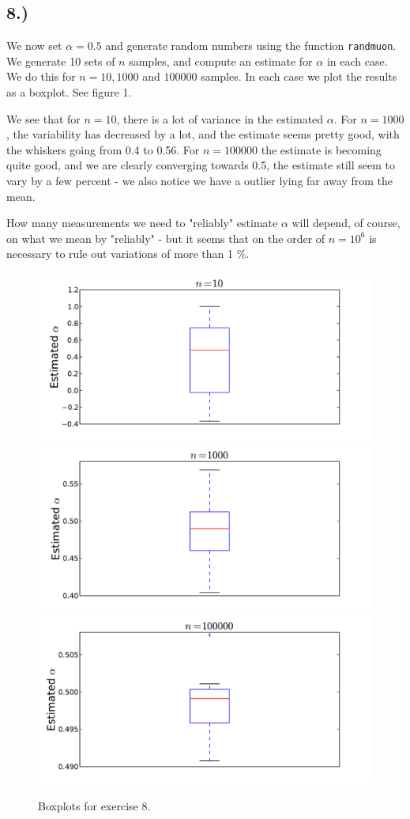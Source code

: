 \documentclass[a4paper, 11pt, notitlepage, english]{article}
\begin{document}
\subsection*{8.)}

We now set $\alpha = 0.5$ and generate random numbers using the function \verb+randmuon+. We generate 10 sets of $n$ samples, and compute an estimate for $\alpha$ in each case. We do this for $n=10, 1000$ and $100000$ samples. In each case we plot the results as a boxplot. See figure 1. 

We see that for $n=10$, there is a lot of variance in the estimated $\alpha$. For $n=1000$, the variability has decreased by a lot, and the estimate seems pretty good, with the whiskers going from 0.4 to 0.56. For $n=100000$ the estimate is becoming quite good, and we are clearly converging towards 0.5, the estimate still seem to vary by a few percent - we also notice we have a outlier lying far away from the mean.

How many measurements we need to "reliably" estimate $\alpha$ will depend, of course, on what we mean by "reliably" - but it seems that on the order of $n=10^6$ is necessary to rule out variations of more than 1 \%.

\begin{figure}
    \centering
    \includegraphics[width=\textwidth]{boxes1}
    \includegraphics[width=\textwidth]{boxes2}
    \includegraphics[width=\textwidth]{boxes3}
    \caption{Boxplots for exercise 8.}
\end{figure}
\end{document}
